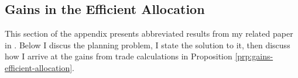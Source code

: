 \documentclass[12pt,pdftex]{article}
\begin{document}
\begin{onehalfspacing}
%
%


\section{Gains in the Efficient Allocation}\label{apx-sec:efficient}

This section of the appendix presents abbreviated results from my related paper in \citet{waughoptimal}. Below I discus the planning problem, I state the solution to it, then discuss how I arrive at the gains from trade calculations in Proposition \ref{prp:gains-efficient-allocation}.


\end{onehalfspacing}
\end{document}
